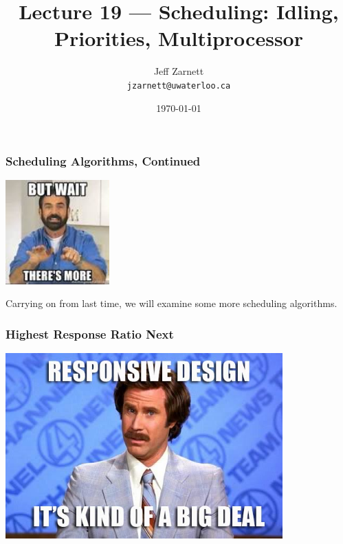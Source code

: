 

\title{Lecture 19 --- Scheduling: Idling, Priorities, Multiprocessor }

\author{Jeff Zarnett \\ \small \texttt{jzarnett@uwaterloo.ca}}
\date{\today}




\begin{frame}
  \titlepage

 \end{frame}



\begin{frame}
\frametitle{Scheduling Algorithms, Continued}

\begin{center}
	\includegraphics[width=0.3\textwidth]{images/theresmore.jpg}
\end{center}

Carrying on from last time, we will examine some more scheduling algorithms.

\end{frame}

\begin{frame}
\frametitle{Highest Response Ratio Next}

\begin{center}
	\includegraphics[width=0.8\textwidth]{images/responsive.jpg}
\end{center}

\end{frame}

